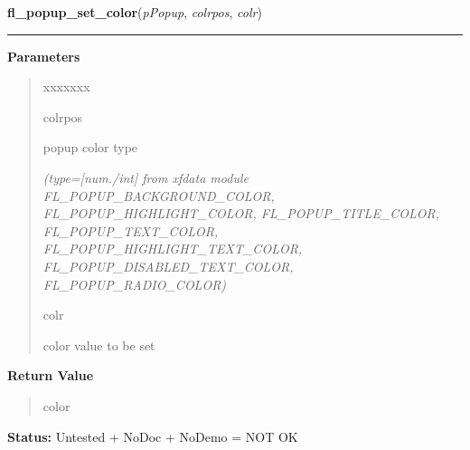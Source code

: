 \hspace{.8\funcindent}\begin{boxedminipage}{\funcwidth}

    \raggedright \textbf{fl\_popup\_set\_color}(\textit{pPopup}, \textit{colrpos}, \textit{colr})

    \vspace{-1.5ex}

    \rule{\textwidth}{0.5\fboxrule}
\setlength{\parskip}{2ex}
\setlength{\parskip}{1ex}
      \textbf{Parameters}
      \vspace{-1ex}

      \begin{quote}
        \begin{Ventry}{xxxxxxx}

          \item[colrpos]

          popup color type

            {\it (type=[num./int] from xfdata module FL\_POPUP\_BACKGROUND\_COLOR, 
FL\_POPUP\_HIGHLIGHT\_COLOR, FL\_POPUP\_TITLE\_COLOR, 
FL\_POPUP\_TEXT\_COLOR, FL\_POPUP\_HIGHLIGHT\_TEXT\_COLOR, 
FL\_POPUP\_DISABLED\_TEXT\_COLOR, FL\_POPUP\_RADIO\_COLOR)}

          \item[colr]

          color value to be set

        \end{Ventry}

      \end{quote}

      \textbf{Return Value}
    \vspace{-1ex}

      \begin{quote}
      color

      \end{quote}

\textbf{Status:} Untested + NoDoc + NoDemo = NOT OK



    \end{boxedminipage}

    \label{xformslib:flpopup:fl_popup_set_cursor}

    \vspace{0.5ex}

